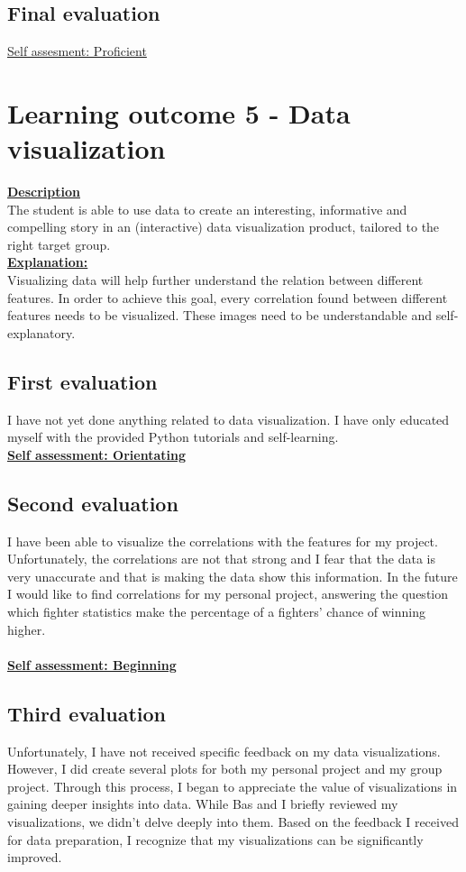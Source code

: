 \documentclass{article}
\begin{document}
	\subsection{Final evaluation}
	\underline{Self assesment: Proficient}
\section{Learning outcome 5 - Data visualization}
\underline{\textbf{Description}}\\
The student is able to use data to create an interesting, informative and 
compelling story in an (interactive) data visualization product, tailored to the right target group.\\
\underline{\textbf{Explanation:}}\\
Visualizing data will help further understand the relation between different features. In order to achieve this goal,
every correlation found between different features needs to be visualized. These images need to be understandable and 
self-explanatory.

\subsection{First evaluation}
I have not yet done anything related to data visualization. I have only educated myself with the provided Python tutorials and self-learning.\\
\underline{\textbf{Self assessment: Orientating}}

\subsection{Second evaluation}
I have been able to visualize the correlations with the features for my project. Unfortunately, the correlations are not that strong and I fear that 
the data is very unaccurate and that is making the data show this information. In the future I would like to find correlations for my personal project, answering 
the question which fighter statistics make the percentage of a fighters' chance of winning higher. \\\\
\underline{\textbf{Self assessment: Beginning}}

\subsection{Third evaluation}
Unfortunately, I have not received specific feedback on my data visualizations. However, I did create several plots for both my personal project and my group project. Through this process, I began to appreciate the value of visualizations in gaining deeper insights into data. While Bas and I briefly reviewed my visualizations, we didn’t delve deeply into them. Based on the feedback I received for data preparation, I recognize that my visualizations can be significantly improved.\\
\end{document}
